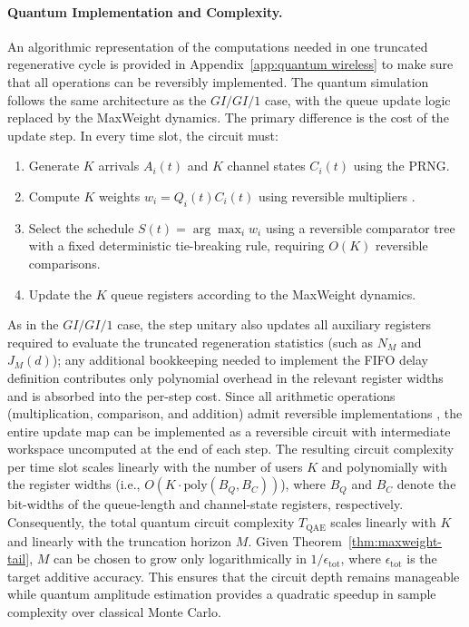 \documentclass[11pt]{article}
\begin{document}
\paragraph{Quantum Implementation and Complexity.}
An algorithmic representation of the computations needed in one truncated regenerative cycle is provided in Appendix~\ref{app:quantum wireless} to make sure that all operations can be reversibly implemented.
The quantum simulation follows the same architecture as the $GI/GI/1$ case, with the
queue update logic replaced by the MaxWeight dynamics.
The primary difference is the cost of the update step.
In every time slot, the circuit must:
\begin{enumerate}
    \item Generate $K$ arrivals $A_i(t)$ and $K$ channel states $C_i(t)$ using the PRNG.
    \item Compute $K$ weights $w_i = Q_i(t) C_i(t)$ using reversible multipliers \cite{vedral1996}.
    \item Select the schedule $S(t) = \arg\max_i w_i$ using a reversible comparator tree with a
    fixed deterministic tie-breaking rule, requiring $O(K)$ reversible comparisons.
    \item Update the $K$ queue registers according to the MaxWeight dynamics.
\end{enumerate}
As in the $GI/GI/1$ case, the step unitary also updates all auxiliary registers required to
evaluate the truncated regeneration statistics (such as $N_M$ and $J_M(d)$); any additional
bookkeeping needed to implement the FIFO delay definition contributes only polynomial
overhead in the relevant register widths and is absorbed into the per-step cost.
Since all arithmetic operations (multiplication, comparison, and addition) admit reversible
implementations \cite{bennett1973}, the entire update map can be implemented as a reversible
circuit with intermediate workspace uncomputed at the end of each step.
The resulting circuit complexity per time slot scales linearly with the number of users $K$ and
polynomially with the register widths (i.e., $O(K\cdot\mathrm{poly}(B_Q,B_C))$), where $B_Q$
and $B_C$ denote the bit-widths of the queue-length and channel-state registers, respectively.
Consequently, the total quantum circuit complexity $T_{\mathrm{QAE}}$ scales linearly with $K$
and linearly with the truncation horizon $M$.
Given Theorem~\ref{thm:maxweight-tail}, $M$ can be chosen to grow only logarithmically in
$1/\epsilon_{\mathrm{tot}}$, where $\epsilon_{\mathrm{tot}}$ is the target additive accuracy.
This ensures that the circuit depth remains manageable while quantum amplitude estimation
provides a quadratic speedup in sample complexity over classical Monte Carlo.
\end{document}
